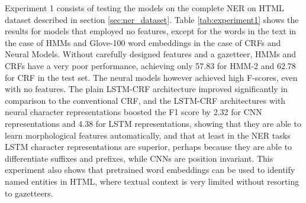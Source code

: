\documentclass[sigconf]{acmart}
\begin{document}
Experiment 1 consists of testing the models on the complete NER on HTML dataset 
described in section \ref{sec:ner_dataset}. Table \ref{tab:experiment1} shows the 
results for models that employed no features, except for the words in the text
in the case of HMMs and Glove-100 word embeddings in the case of CRFs and Neural Models.
Without carefully designed features and a gazetteer, HMMs and CRFs have a very 
poor performance, achieving only 57.83 for HMM-2 and 62.78 for CRF in the test set. 
The neural models however achieved high F-scores, even with no features. The
plain LSTM-CRF architecture improved significantly in comparison to the conventional CRF,
and the LSTM-CRF architectures with neural character representations boosted the F1 score
by 2.32 for CNN representations and 4.38 for LSTM representations, showing that they are 
able to learn morphological features automatically, and that at least in the NER tasks LSTM 
character representations are superior, perhaps because they are able to differentiate 
suffixes and prefixes, while CNNs are position invariant. This experiment also shows that
pretrained word embeddings can be used to identify named entities in HTML, where
textual context is very limited without resorting to gazetteers.
\end{document}
